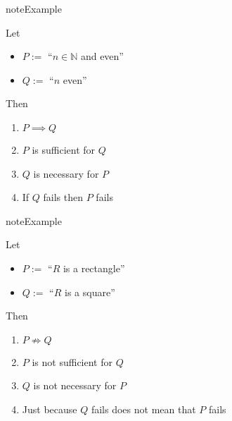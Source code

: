\documentclass[letterpaper,10pt,english]{jupyterBook}
\begin{document}
\begin{figure}[htbp]
\centering

\noindent{}
\end{figure}

\begin{sphinxadmonition}{note}{Example}

\sphinxAtStartPar
Let
\begin{itemize}
\item {} 
\sphinxAtStartPar
\(P := \) “\(n \in \mathbb{N}\) and even”

\item {} 
\sphinxAtStartPar
\(Q := \) “\(n\) even”

\end{itemize}

\sphinxAtStartPar
Then
\begin{enumerate}
%
\item {} 
\sphinxAtStartPar
\(P \implies Q\)

\item {} 
\sphinxAtStartPar
\(P\) is sufficient for \(Q\)

\item {} 
\sphinxAtStartPar
\(Q\) is necessary for \(P\)

\item {} 
\sphinxAtStartPar
If \(Q\) fails then \(P\) fails

\end{enumerate}
\end{sphinxadmonition}

\begin{sphinxadmonition}{note}{Example}

\sphinxAtStartPar
Let
\begin{itemize}
\item {} 
\sphinxAtStartPar
\(P := \) “\(R\) is a rectangle”

\item {} 
\sphinxAtStartPar
\(Q := \) “\(R\) is a square”

\end{itemize}

\sphinxAtStartPar
Then
\begin{enumerate}
%
\item {} 
\sphinxAtStartPar
\(P \not \Rightarrow Q\)

\item {} 
\sphinxAtStartPar
\(P\) is not sufficient for \(Q\)

\item {} 
\sphinxAtStartPar
\(Q\) is not necessary for \(P\)

\item {} 
\sphinxAtStartPar
Just because \(Q\) fails does not mean that \(P\) fails

\end{enumerate}
\end{sphinxadmonition}
\end{document}
